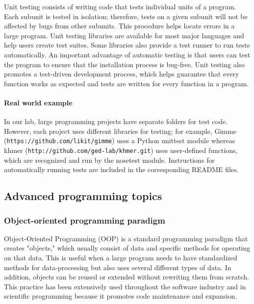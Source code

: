 \documentclass[ChapterTOCs,krantz2]{krantz} %
\begin{document}
Unit testing consists of writing
code that tests individual units of a program. 
Each subunit is tested in isolation; therefore, tests 
on a given subunit will not be affected by bugs from other subunits. This
procedure helps locate errors in a large program. 
Unit testing libraries are available for most major languages
and help users create test
suites. Some libraries also
provide a test runner to run tests automatically. An important
advantage of automatic testing is that users can
test the program to ensure that the installation process is bug-free.  Unit
testing also promotes a test-driven development process, which 
helps guarantee that
every function works as expected and tests are written for every function in a
program.

\paragraph{Real world example}

In our lab,
large programming projects have separate folders for test code. However, each project uses
different libraries for testing; for example, Gimme
(\texttt{https://github.com/likit/gimme}) uses a Python unittest module whereas khmer
(\texttt{http://github.com/ged-lab/khmer.git}) uses user-defined functions, which are
recognized and run by the nosetest module. Instructions for automatically
running tests are included in the corresponding README
files.

\subsection{Advanced programming topics}

\subsubsection{Object-oriented programming paradigm}

Object-Oriented Programming (OOP) is a standard programming paradigm that
creates "objects," which usually consist of data 
and specific methods for operating on that data. This is useful when a large program 
needs to have standardized methods for data-processing but also uses 
several different types of data.
In addition, objects can be reused or extended without rewriting them from scratch.
This practice has been extensively used throughout the software industry and 
in scientific programming because it promotes code maintenance and expansion.
\end{document}
